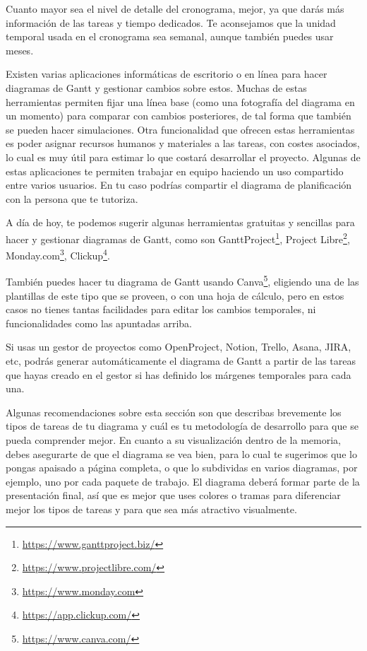 Cuanto mayor sea el nivel de detalle del cronograma, mejor, ya que darás más información de las tareas y tiempo dedicados. Te aconsejamos que la unidad temporal usada en el cronograma sea semanal, aunque también puedes usar meses. 

Existen varias aplicaciones informáticas de escritorio o en línea para hacer diagramas de Gantt y gestionar cambios sobre estos. Muchas de estas herramientas permiten fijar una línea base (como una fotografía del diagrama en un momento) para comparar con cambios posteriores, de tal forma que también se pueden hacer simulaciones. Otra funcionalidad que ofrecen estas herramientas es poder asignar recursos humanos y materiales a las tareas, con costes asociados, lo cual es muy útil para estimar lo que costará desarrollar el proyecto. Algunas de estas aplicaciones te permiten trabajar en equipo haciendo un uso compartido entre varios usuarios. En tu caso podrías compartir el diagrama de planificación con la persona que te tutoriza.

A día de hoy, te podemos sugerir algunas herramientas gratuitas y sencillas para hacer y gestionar diagramas de Gantt, como son {GanttProject}\footnote{\url{https://www.ganttproject.biz/}}, {Project Libre}\footnote{\url{https://www.projectlibre.com/}}, 
 {Monday.com}\footnote{\url{https://www.monday.com}}, {Clickup}\footnote{\url{https://app.clickup.com/}}. 

También puedes hacer tu diagrama de Gantt usando {Canva}\footnote{\url{https://www.canva.com/}}, eligiendo una de las plantillas de este tipo que se proveen, o con una hoja de cálculo, pero en estos casos no tienes tantas facilidades para editar los cambios temporales, ni funcionalidades como las apuntadas arriba. 

Si usas un gestor de proyectos como OpenProject, Notion, Trello, Asana, JIRA, etc, podrás generar automáticamente el diagrama de Gantt a partir de las tareas que hayas creado en el gestor si has definido los márgenes temporales para cada una.

Algunas recomendaciones sobre esta sección son que describas brevemente los tipos de tareas de tu diagrama y cuál es tu metodología de desarrollo para que se pueda comprender mejor. En cuanto a su visualización dentro de la memoria, debes asegurarte de que el diagrama se vea bien, para lo cual te sugerimos que lo pongas apaisado a página completa, o que lo subdividas en varios diagramas, por ejemplo, uno por cada paquete de trabajo. El diagrama deberá formar parte de la presentación final, así que es mejor que uses colores o tramas para diferenciar mejor los tipos de tareas y para que sea más atractivo visualmente. 


